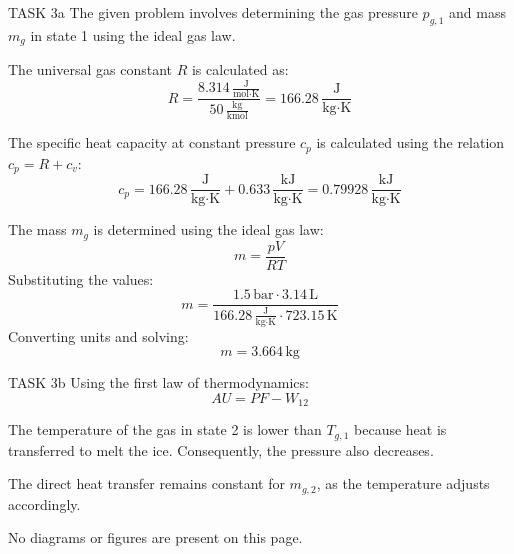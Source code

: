 TASK 3a  
The given problem involves determining the gas pressure \( p_{g,1} \) and mass \( m_g \) in state 1 using the ideal gas law.  

The universal gas constant \( R \) is calculated as:  
\[
R = \frac{8.314 \, \frac{\text{J}}{\text{mol·K}}}{50 \, \frac{\text{kg}}{\text{kmol}}} = 166.28 \, \frac{\text{J}}{\text{kg·K}}
\]  

The specific heat capacity at constant pressure \( c_p \) is calculated using the relation \( c_p = R + c_v \):  
\[
c_p = 166.28 \, \frac{\text{J}}{\text{kg·K}} + 0.633 \, \frac{\text{kJ}}{\text{kg·K}} = 0.79928 \, \frac{\text{kJ}}{\text{kg·K}}
\]  

The mass \( m_g \) is determined using the ideal gas law:  
\[
m = \frac{p V}{R T}
\]  
Substituting the values:  
\[
m = \frac{1.5 \, \text{bar} \cdot 3.14 \, \text{L}}{166.28 \, \frac{\text{J}}{\text{kg·K}} \cdot 723.15 \, \text{K}}
\]  
Converting units and solving:  
\[
m = 3.664 \, \text{kg}
\]  

TASK 3b  
Using the first law of thermodynamics:  
\[
AU = PF - W_{12}
\]  

The temperature of the gas in state 2 is lower than \( T_{g,1} \) because heat is transferred to melt the ice. Consequently, the pressure also decreases.  

The direct heat transfer remains constant for \( m_{g,2} \), as the temperature adjusts accordingly.  

No diagrams or figures are present on this page.